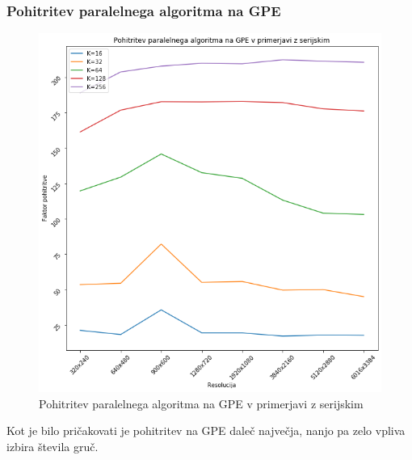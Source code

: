 \documentclass[11pt]{article}
\begin{document}
\subsubsection{Pohitritev paralelnega algoritma na GPE}
\begin{figure}[H]
    \label{img:gpu_perf}
    \centering
    \includegraphics[scale=0.28]{gpu_perf.png}
    \caption{Pohitritev paralelnega algoritma na GPE v primerjavi z serijskim}
\end{figure}

Kot je bilo pričakovati je pohitritev na GPE daleč največja, nanjo pa zelo vpliva izbira števila gruč.
\end{document}

